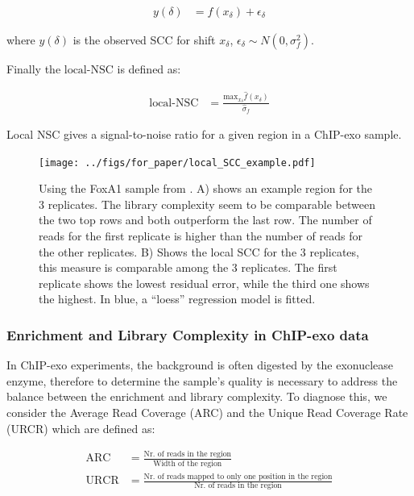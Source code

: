 \documentclass[11pt]{article}\usepackage[]{graphicx}\usepackage[]{color}
\begin{document}
\begin{align}
 y(\delta) &= f(x_\delta) + \epsilon_\delta \nonumber
\end{align}

where $y(\delta)$ is the observed SCC for shift $x_\delta$,
$\epsilon_\delta \sim N(0,\sigma_f^2)$. 


Finally the $\mbox{local-NSC}$ is defined as:

\begin{align}
    \mbox{local-NSC} &= \frac{\mbox{max}_{x_\delta} \hat{f}(x_\delta)}{\hat{\sigma}_f} 
\label{locNSC}
\end{align}

Local NSC gives a signal-to-noise ratio for a given region in a
ChIP-exo sample. 

\begin{figure}[H]
  \centering
  \texttt{[image: ../figs/for\_paper/local\_SCC\_example.pdf]}
  \caption{Using the FoxA1 sample from \cite{exoillumina}. A) shows an
    example region for the 3 replicates. The library complexity seem
    to be comparable between the two top rows and both outperform the
    last row. The number of reads for the first replicate is higher
    than the number of reads for the other replicates. B) Shows the
    local SCC for the 3 replicates, this measure is comparable among
    the 3 replicates. The first replicate shows the lowest residual
    error, while the third one shows the highest. In blue, a ``loess''
    regression model is fitted.}
\label{fig:locSCC}
\end{figure}

\subsubsection{Enrichment and Library Complexity in ChIP-exo data}
\label{sec:enri}

In ChIP-exo experiments, the background is often digested by the
exonuclease enzyme, therefore to determine the sample's quality is
necessary to address the balance between the enrichment and library
complexity. To diagnose this, we consider the Average Read Coverage
(ARC) and the Unique Read Coverage Rate (URCR) which are defined as:

\begin{align}
  \mbox{ARC} &= \frac{\text{Nr. of reads in the region}}{\text{Width of the region}} \nonumber \\
  \mbox{URCR} &= \frac{\text{Nr. of reads mapped to only one position
      in the region}}{\text{Nr. of reads in the region}} \nonumber
\end{align}
\end{document}
